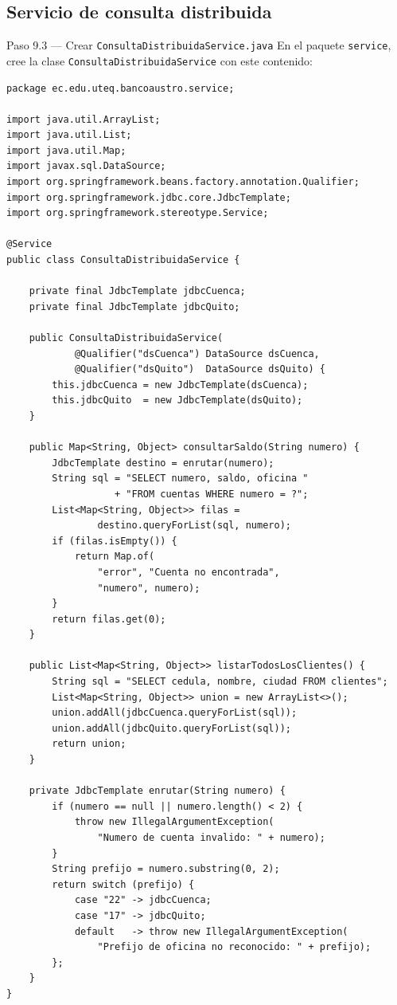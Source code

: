 \documentclass[11pt,a4paper]{article}
\begin{document}
\subsection{Servicio de consulta distribuida}

\begin{pasobox}{Paso 9.3 --- Crear \texttt{ConsultaDistribuidaService.java}}
En el paquete \texttt{service}, cree la clase \texttt{ConsultaDistribuidaService} con este contenido:

\begin{lstlisting}[style=javastyle,caption={service/ConsultaDistribuidaService.java}]
package ec.edu.uteq.bancoaustro.service;

import java.util.ArrayList;
import java.util.List;
import java.util.Map;
import javax.sql.DataSource;
import org.springframework.beans.factory.annotation.Qualifier;
import org.springframework.jdbc.core.JdbcTemplate;
import org.springframework.stereotype.Service;

@Service
public class ConsultaDistribuidaService {

    private final JdbcTemplate jdbcCuenca;
    private final JdbcTemplate jdbcQuito;

    public ConsultaDistribuidaService(
            @Qualifier("dsCuenca") DataSource dsCuenca,
            @Qualifier("dsQuito")  DataSource dsQuito) {
        this.jdbcCuenca = new JdbcTemplate(dsCuenca);
        this.jdbcQuito  = new JdbcTemplate(dsQuito);
    }

    public Map<String, Object> consultarSaldo(String numero) {
        JdbcTemplate destino = enrutar(numero);
        String sql = "SELECT numero, saldo, oficina "
                   + "FROM cuentas WHERE numero = ?";
        List<Map<String, Object>> filas =
                destino.queryForList(sql, numero);
        if (filas.isEmpty()) {
            return Map.of(
                "error", "Cuenta no encontrada",
                "numero", numero);
        }
        return filas.get(0);
    }

    public List<Map<String, Object>> listarTodosLosClientes() {
        String sql = "SELECT cedula, nombre, ciudad FROM clientes";
        List<Map<String, Object>> union = new ArrayList<>();
        union.addAll(jdbcCuenca.queryForList(sql));
        union.addAll(jdbcQuito.queryForList(sql));
        return union;
    }

    private JdbcTemplate enrutar(String numero) {
        if (numero == null || numero.length() < 2) {
            throw new IllegalArgumentException(
                "Numero de cuenta invalido: " + numero);
        }
        String prefijo = numero.substring(0, 2);
        return switch (prefijo) {
            case "22" -> jdbcCuenca;
            case "17" -> jdbcQuito;
            default   -> throw new IllegalArgumentException(
                "Prefijo de oficina no reconocido: " + prefijo);
        };
    }
}
\end{lstlisting}
\end{pasobox}
\end{document}
